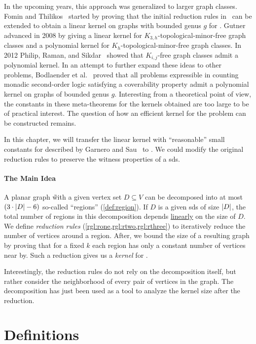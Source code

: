 In the upcoming years, this approach was generalized to larger graph classes. 
Fomin and Thilikos~\cite{Fomin2004} started by proving that the initial reduction rules in~\cite{Alber2004} can be extended to obtain a linear kernel on graphs with bounded genus $g$ for \dom.
Gutner~\cite{Gutner2009} advanced in 2008 by giving a linear kernel for $K_{3,h}$-topological-minor-free graph classes and a polynomial kernel for $K_h$-topological-minor-free graph classes. 
In 2012 Philip, Raman, and Sikdar~\cite{Philip2012} showed that $K_{i,j}$-free graph classes admit a polynomial kernel. 
In an attempt to further expand these ideas to other problems, Bodlaender et al.~\cite{Bodlaender2016} proved that all problems expressible in counting monadic second-order logic satisfying a coverability property admit a polynomial kernel on graphs of bounded genus $g$. 
Interesting from a theoretical point of view, the constants in these meta-theorems for the kernels obtained are too large to be of practical interest. 
The question of how an efficient kernel for the \psdom problem can be constructed remains. 

In this chapter, we will transfer the linear kernel with ``reasonable'' small constants for \ptdom described by Garnero and Sau~\cite[arXiv v2]{Garnero2018} to \psdom. 
We could modify the original reduction rules to preserve the witness properties of a sds. 

 \paragraph{The Main Idea} A planar graph \G with a given vertex set $D \subseteq V$ can be decomposed into at most $(3 \cdot \abs{D}-6)$ so-called ``regions'' (\cref{def:region}). 
 If $D$ is a given sds of size $\abs{D}$, the total number of regions in this decomposition depends \underline{linearly} on the size of $D$. 
 We define \textit{reduction rules} (\cref{rgl:rone,rgl:rtwo,rgl:rthree}) to iteratively reduce the number of vertices around a region.
 After, we bound the size of a resulting graph by proving that for a fixed $k$ each region has only a constant number of vertices near by. 
Such a reduction gives us a \textit{kernel} for \psdom.

Interestingly, the reduction rules do not rely on the decomposition itself, but rather consider the neighborhood of every pair of vertices in the graph. 
The decomposition has just been used as a tool to analyze the kernel size after the reduction.


\section{Definitions}

